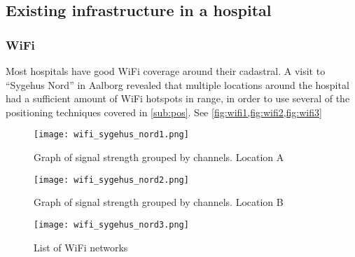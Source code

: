\subsection{Existing infrastructure in a hospital} \label{sub:infra}

\subsubsection{WiFi}

Most hospitals have good WiFi coverage around their cadastral. A visit to \enquote{Sygehus Nord} in Aalborg revealed that multiple locations around the hospital had a sufficient amount of WiFi hotspots in range, in order to use several of the positioning techniques covered in \cref{sub:pos}. See \cref{fig:wifi1,fig:wifi2,fig:wifi3}

\begin{figure}
\centering
  \begin{minipage}{0.45\textwidth}
    \centering
    \texttt{[image: wifi\_sygehus\_nord1.png]}
    \caption{Graph of signal strength grouped by channels. Location A} \label{fig:wifi1}
  \end{minipage}
  \hfill
  \begin{minipage}{0.45\textwidth}
    \centering
    \texttt{[image: wifi\_sygehus\_nord2.png]}
    \caption{Graph of signal strength grouped by channels. Location B} \label{fig:wifi2}
  \end{minipage}
    \begin{minipage}{0.45\textwidth}
    \centering
    \texttt{[image: wifi\_sygehus\_nord3.png]}
    \caption{List of WiFi networks} \label{fig:wifi3}
  \end{minipage}
  \end{figure}

